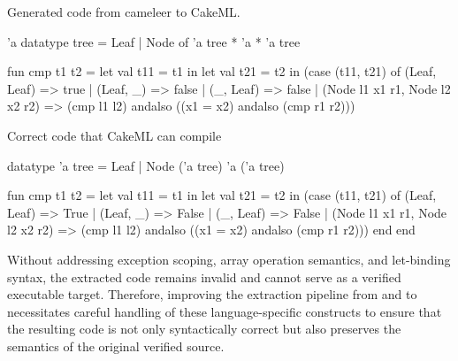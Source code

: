 Generated code from cameleer to CakeML.

\begin{cakeml}
'a datatype tree = Leaf | Node of 'a tree * 'a * 'a tree

fun cmp t1 t2 = let val t11 = t1 in
  let val t21 = t2 in
  (case (t11, t21) of
    (Leaf, Leaf) => true
  | (Leaf, _) => false
  | (_, Leaf) => false
  | (Node l1 x1 r1, Node l2 x2 r2) =>
    (cmp l1 l2) andalso ((x1 = x2) andalso (cmp r1 r2)))
\end{cakeml}

Correct code that CakeML can compile

\begin{cakeml}
datatype 'a tree = Leaf | Node ('a tree) 'a ('a tree)

fun cmp t1 t2 = let val t11 = t1 in
  let val t21 = t2 in
  (case (t11, t21) of
    (Leaf, Leaf) => True
  | (Leaf, _) => False
  | (_, Leaf) => False
  | (Node l1 x1 r1, Node l2 x2 r2) =>
    (cmp l1 l2) andalso ((x1 = x2) andalso (cmp r1 r2)))
    end
  end
\end{cakeml}


Without addressing exception scoping, array operation semantics, and let-binding syntax, the extracted code remains invalid 
and cannot serve as a verified executable target. Therefore, improving the extraction pipeline from \ocaml and \gospel to 
\cml necessitates careful handling of these language-specific constructs to ensure that the resulting code is not only 
syntactically correct but also preserves the semantics of the original verified source.